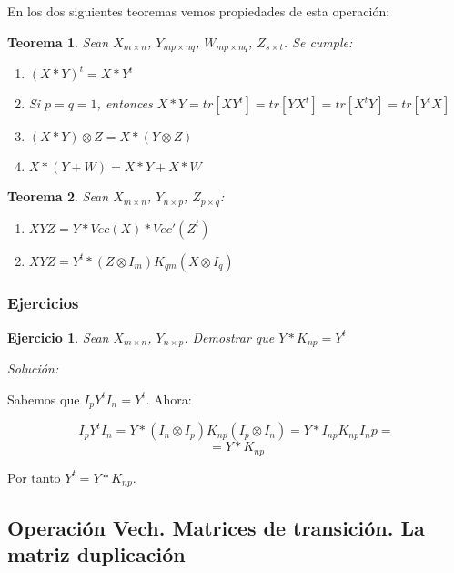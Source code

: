 \documentclass{article}
\theoremstyle{theorem-style}  %
\newtheorem{theorem}{Teorema}[section]  %
\theoremstyle{definition-style}
\theoremstyle{example-style}
\theoremstyle{exercise-style}
\newtheorem{exercise}{Ejercicio}[section]
\begin{document}
	En los dos siguientes teoremas vemos propiedades de esta operación:
	
	\begin{theorem}
		Sean $X_{m \times n}$, $Y_{mp \times nq}$, $W_{mp \times nq}$, $Z_{s \times t}$. Se cumple:
		\begin{enumerate}
			
			\item $(X*Y)^t=X*Y^t$
			
			\item Si $p=q=1$, entonces $X*Y =tr[XY^t]=tr[YX^t]=tr[X^tY]=tr[Y^tX]$
			
			\item $(X*Y) \otimes Z = X * (Y \otimes Z)$
			
			\item $X * (Y+W) = X*Y + X*W$
			
		\end{enumerate}	
	\end{theorem}
	
	\begin{theorem}
		Sean $X_{m \times n}$, $Y_{n \times p}$, $Z_{p \times q}$:
		
		\begin{enumerate}
			\item $XYZ= Y*Vec(X)*Vec'(Z^t)$
			
			\item $ XYZ = Y^t * (Z \otimes I_m)K_{qm}(X \otimes I_q)$ 
		\end{enumerate}
	\end{theorem}
	
	\subsubsection{Ejercicios}
	\begin{exercise}
		Sean $X_{m \times n}$, $Y_{n \times p}$. Demostrar que $Y*K_{np}=Y^t$
	\end{exercise}
	
	\textit{Solución:}
	
	Sabemos que $I_p Y^t I_n = Y^t$. Ahora:
	
	$$ I_p Y^t I_n = Y * (I_n \otimes I_p)K_{np}(I_p \otimes I_n) = Y*I_{np}K_{np}{I_np}= $$
	$$ = Y*K_{np}$$ 
	
	Por tanto $Y^t=Y*K_{np}$.
	
	
	\subsection{Operación Vech. Matrices de transición. La matriz duplicación}
	
\end{document}

